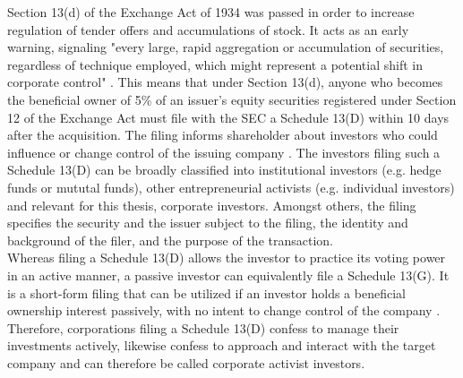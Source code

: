 \documentclass[12pt]{article}
\begin{document}
Section 13(d) of the Exchange Act of 1934 was passed in order to increase regulation of tender offers and accumulations of stock.
It acts as an early warning, signaling "every large, rapid aggregation or accumulation of securities, regardless of technique employed, which might represent a potential shift in corporate control" \citep[p.2]{Morrison2015}. 
This means that under Section 13(d), anyone who becomes the beneficial owner of 5\% of an issuer's equity securities registered under Section 12 of the Exchange Act must file with the SEC a Schedule 13(D) within 10 days after the acquisition. The filing informs shareholder about investors who could influence or change control of the issuing company \citep[p.110]{Giglia2016}. The investors filing such a Schedule 13(D) can be broadly classified into institutional investors (e.g. hedge funds or mututal funds), other entrepreneurial activists (e.g. individual investors) \citep[p.188]{Klein2009} and relevant for this thesis, corporate investors. Amongst others, the filing specifies the security and the issuer subject to the filing, the identity and background of the filer, and the purpose of the transaction.\\
Whereas filing a Schedule 13(D) allows the investor to practice its voting power in an active manner, a passive investor can equivalently file a Schedule 13(G). It is a short-form filing that can be utilized if an investor holds a beneficial ownership interest passively, with no intent to change control of the company \citep{Giglia2016}. Therefore, corporations filing a Schedule 13(D) confess to manage their investments actively, likewise confess to approach and interact with the target company and can therefore be called corporate activist investors. 
\end{document}
